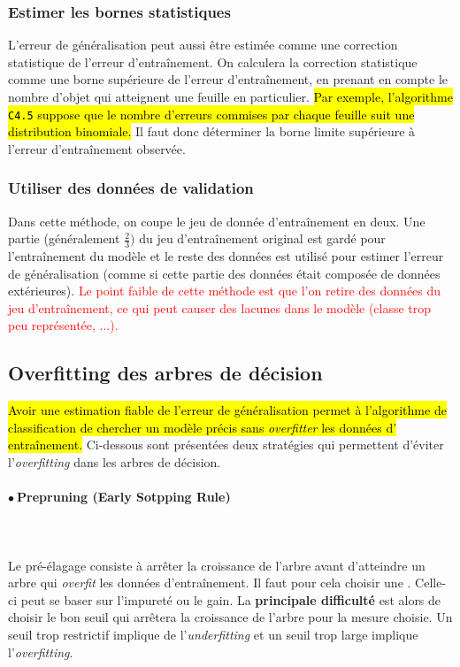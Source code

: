 \documentclass[letterpaper, 12pt]{article}
\newcommand{\alinea}{
\hspace*{0.5cm}}
\newcommand{\red}[1]{
	\textcolor{red}{#1}}
\newcommand{\point}{$\bullet\ $}
\newcommand{\myul}[1]{
		\underline{\smash{#1}}
	}
\begin{document}
			\subsubsection{Estimer les bornes statistiques}
			\alinea L'erreur de généralisation peut aussi être estimée
				comme une correction statistique de l'erreur d'entraînement.
				On calculera la correction statistique comme une borne
				supérieure de l'erreur d'entraînement, en prenant en compte
				le nombre d'objet qui atteignent une feuille en particulier.
				\hl{Par exemple, l'algorithme \texttt{C4.5} suppose que
				le nombre d'erreurs commises par chaque feuille suit une
				distribution binomiale.} Il faut donc déterminer la borne 
				limite supérieure à l'erreur d'entraînement observée.
			\subsubsection{Utiliser des données de validation}
			\alinea Dans cette méthode, on coupe le jeu de donnée
				d'entraînement en deux. Une partie (généralement $\frac{2}{3})$
				du jeu d'entraînement original est gardé pour l'entraînement
				du modèle et le reste des données est utilisé pour estimer
				l'erreur de généralisation (comme si cette partie des données
				était composée de données extérieures). \red{Le point faible
				de cette méthode est que l'on retire des données du
				jeu d'entraînement, ce qui peut causer des lacunes dans le
				modèle (classe trop peu représentée, ...).}
		\subsection{Overfitting des arbres de décision}
			\alinea \hl{Avoir une estimation fiable de l'erreur 
				de généralisation
				permet à l'algorithme de classification de chercher un 
				modèle précis sans \textit{overfitter} les données d'%
				entraînement.} Ci-dessous sont présentées deux stratégies
				qui permettent d'éviter l'\textit{overfitting} dans les
				arbres de décision.
			\paragraph{\point Prepruning (Early Sotpping Rule)}~\\~\\
			\alinea Le pré-élagage consiste à arrêter la croissance de l'arbre
				avant d'atteindre un arbre qui \textit{overfit} les données
				d'entraînement. Il faut pour cela choisir une \myul{condition
				d'arrêt}. Celle-ci peut se baser sur l'impureté ou le gain.
				La \textbf{principale difficulté} est alors de choisir
				le bon seuil qui arrêtera la croissance de l'arbre pour
				la mesure choisie. Un seuil trop restrictif implique
				de l'\textit{underfitting} et un seuil trop large 
				implique l'\textit{overfitting}.
\end{document}
